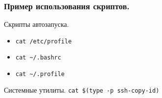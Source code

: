 \begin{frame}[fragile]
\frametitle{ Пример использования скриптов.}
  \begin{block}{Скрипты автозапуска.}
     \begin{itemize}
        \item {\tt cat /etc/profile }
        \item {\tt cat \textasciitilde{}/.bashrc}
        \item {\tt cat \textasciitilde{}/.profile}
     \end{itemize}
  \end{block}

  \begin{block}{Системные утилиты.}
   {\tt cat \$(type -p ssh-copy-id) }
  \end{block}
\end{frame}

